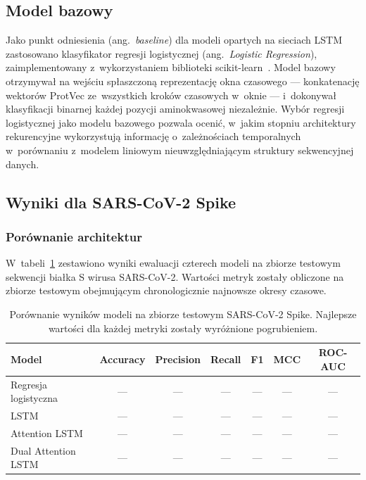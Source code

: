 \subsection{Model bazowy}

Jako punkt odniesienia (ang.~\textit{baseline}) dla modeli opartych na sieciach LSTM zastosowano klasyfikator regresji logistycznej (ang.~\textit{Logistic Regression}), zaimplementowany z~wykorzystaniem biblioteki scikit-learn~\cite{pedregosa2011sklearn}. Model bazowy otrzymywał na wejściu spłaszczoną reprezentację okna czasowego --- konkatenację wektorów ProtVec ze~wszystkich kroków czasowych w~oknie --- i~dokonywał klasyfikacji binarnej każdej pozycji aminokwasowej niezależnie. Wybór regresji logistycznej jako modelu bazowego pozwala ocenić, w~jakim stopniu architektury rekurencyjne wykorzystują informację o~zależnościach temporalnych w~porównaniu z~modelem liniowym nieuwzględniającym struktury sekwencyjnej danych.

\subsection{Wyniki dla SARS-CoV-2 Spike}
\label{sec:results-sarscov2}

\subsubsection{Porównanie architektur}

W~tabeli~\ref{tab:results-sarscov2} zestawiono wyniki ewaluacji czterech modeli na zbiorze testowym sekwencji białka S wirusa SARS-CoV-2. Wartości metryk zostały obliczone na zbiorze testowym obejmującym chronologicznie najnowsze okresy czasowe.

\begin{table}[H]
    \centering
    \caption{Porównanie wyników modeli na zbiorze testowym SARS-CoV-2 Spike. Najlepsze wartości dla każdej metryki zostały wyróżnione pogrubieniem.}
    \label{tab:results-sarscov2}
    \begin{tabular}{lcccccc}
        \toprule
        \textbf{Model} & \textbf{Accuracy} & \textbf{Precision} & \textbf{Recall} & \textbf{F1} & \textbf{MCC} & \textbf{ROC-AUC} \\
        \midrule
        Regresja logistyczna    & --- & --- & --- & --- & --- & --- \\
        LSTM                    & --- & --- & --- & --- & --- & --- \\
        Attention LSTM          & --- & --- & --- & --- & --- & --- \\
        Dual Attention LSTM     & --- & --- & --- & --- & --- & --- \\
        \bottomrule
    \end{tabular}
\end{table}

